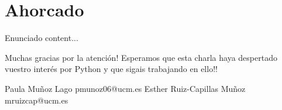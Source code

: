 \documentclass{beamer}
\begin{document}
    \section{Ahorcado}
        
    \begin{frame}{Enunciado}
        content...
    \end{frame}

    \begin{frame}[focus]
        Muchas gracias por la atención! \newline
        Esperamos que esta charla haya despertado vuestro interés por Python y que sigais trabajando en ello!!
    \end{frame}

	\begin{frame}[focus]
    	Paula Muñoz Lago pmunoz06@ucm.es \newline
    	Esther Ruiz-Capillas Muñoz mruizcap@ucm.es
	\end{frame}
\end{document}
